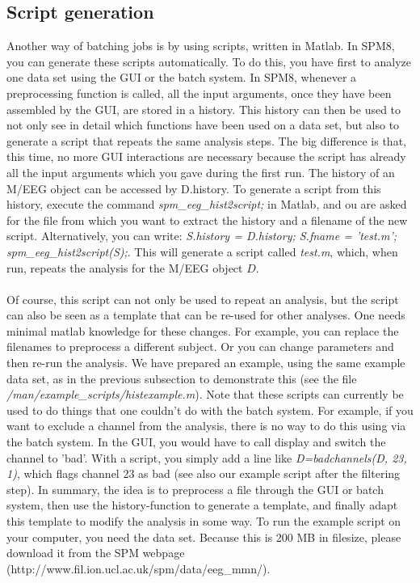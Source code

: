 \subsection{Script generation}
Another way of batching jobs is by using scripts, written in Matlab. 
In SPM8, you can generate these scripts automatically. 
To do this, you have first to analyze one data set using the 
GUI or the batch system. In SPM8, whenever a preprocessing 
function is called, all the input arguments, once they have been 
assembled by the GUI, are stored in a history. This history 
can then be used to not only see in detail which functions have
been used on a data set, but also to generate a script that 
repeats the same analysis steps. The big difference is that,
this time, no more GUI interactions are necessary because
the script has already all the input arguments which you gave
during the first run. The history of an M/EEG object can be 
accessed by D.history. To generate a script from this history,
execute the command \textit{spm\_eeg\_hist2script;} in Matlab, and 
ou are asked for the file from which you want to extract the history 
and a filename of the new script. Alternatively, 
you can write: \textit{S.history = D.history; S.fname = 'test.m'; spm\_eeg\_hist2script(S);}.
This will generate a script called \textit{test.m}, which, when run, repeats the analysis for the M/EEG object $D$. 
\\
\\
Of course, this script can not only be used to repeat an analysis, 
but the script can also be seen as a template that can be re-used 
for other analyses. One needs minimal matlab knowledge for these changes. 
For example, you can replace the filenames to preprocess a different subject.
Or you can change parameters and then re-run the analysis. We have prepared 
an example, using the same example data set, as in the previous subsection to
demonstrate this (see the file \textit{/man/example\_scripts/histexample.m}). 
Note that these scripts can currently be used to do things that one couldn't 
do with the batch system. For example, if you want to exclude a channel from 
the analysis, there is no way to do this using via the batch system. In the 
GUI, you would have to call display and switch the channel to 'bad'. With a 
script, you simply add a line like \textit{D=badchannels(D, 23, 1)}, which 
flags channel 23 as bad (see also our example script after the filtering step). 
In summary, the idea is to preprocess a file through the GUI or batch system, 
then use the history-function to generate a template, and finally adapt this 
template to modify the analysis in some way. To run the example script on your
computer, you need the data set. Because this is 200 MB in filesize, please
download it from the SPM webpage (http://www.fil.ion.ucl.ac.uk/spm/data/eeg\_mmn/).